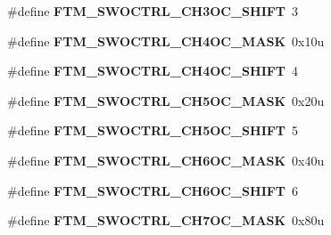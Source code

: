 \begin{DoxyCompactItemize}
\item 
\hypertarget{group___f_t_m___register___masks_ga1520a6f7f9d94248c38bb2b2a6fdd068}{}\#define {\bfseries F\+T\+M\+\_\+\+S\+W\+O\+C\+T\+R\+L\+\_\+\+C\+H3\+O\+C\+\_\+\+S\+H\+I\+F\+T}~3\label{group___f_t_m___register___masks_ga1520a6f7f9d94248c38bb2b2a6fdd068}

\item 
\hypertarget{group___f_t_m___register___masks_ga8e7d553c823d031e23a2ca14cef77ed4}{}\#define {\bfseries F\+T\+M\+\_\+\+S\+W\+O\+C\+T\+R\+L\+\_\+\+C\+H4\+O\+C\+\_\+\+M\+A\+S\+K}~0x10u\label{group___f_t_m___register___masks_ga8e7d553c823d031e23a2ca14cef77ed4}

\item 
\hypertarget{group___f_t_m___register___masks_gaf60fd436bae3cc28d58bdef99ce082c9}{}\#define {\bfseries F\+T\+M\+\_\+\+S\+W\+O\+C\+T\+R\+L\+\_\+\+C\+H4\+O\+C\+\_\+\+S\+H\+I\+F\+T}~4\label{group___f_t_m___register___masks_gaf60fd436bae3cc28d58bdef99ce082c9}

\item 
\hypertarget{group___f_t_m___register___masks_ga1c11baa172a252f899b39e8c96f8c213}{}\#define {\bfseries F\+T\+M\+\_\+\+S\+W\+O\+C\+T\+R\+L\+\_\+\+C\+H5\+O\+C\+\_\+\+M\+A\+S\+K}~0x20u\label{group___f_t_m___register___masks_ga1c11baa172a252f899b39e8c96f8c213}

\item 
\hypertarget{group___f_t_m___register___masks_ga10aa816fdf5d6c7759f2343e74dab618}{}\#define {\bfseries F\+T\+M\+\_\+\+S\+W\+O\+C\+T\+R\+L\+\_\+\+C\+H5\+O\+C\+\_\+\+S\+H\+I\+F\+T}~5\label{group___f_t_m___register___masks_ga10aa816fdf5d6c7759f2343e74dab618}

\item 
\hypertarget{group___f_t_m___register___masks_gae50b63621d0f71b3bc8b19f0fd851815}{}\#define {\bfseries F\+T\+M\+\_\+\+S\+W\+O\+C\+T\+R\+L\+\_\+\+C\+H6\+O\+C\+\_\+\+M\+A\+S\+K}~0x40u\label{group___f_t_m___register___masks_gae50b63621d0f71b3bc8b19f0fd851815}

\item 
\hypertarget{group___f_t_m___register___masks_ga6440cb11055e9d43b210a2186beff55f}{}\#define {\bfseries F\+T\+M\+\_\+\+S\+W\+O\+C\+T\+R\+L\+\_\+\+C\+H6\+O\+C\+\_\+\+S\+H\+I\+F\+T}~6\label{group___f_t_m___register___masks_ga6440cb11055e9d43b210a2186beff55f}

\item 
\hypertarget{group___f_t_m___register___masks_gad27d690f6ab9c6c159c25ca2375a25a4}{}\#define {\bfseries F\+T\+M\+\_\+\+S\+W\+O\+C\+T\+R\+L\+\_\+\+C\+H7\+O\+C\+\_\+\+M\+A\+S\+K}~0x80u\label{group___f_t_m___register___masks_gad27d690f6ab9c6c159c25ca2375a25a4}


\end{DoxyCompactItemize}
